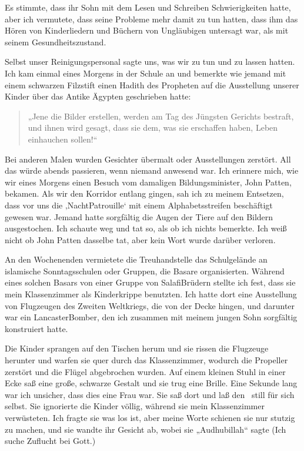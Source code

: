 \documentclass[12pt]{memoir}
\begin{document}
Es stimmte, dass ihr Sohn mit dem Lesen und Schreiben Schwierigkeiten hatte,
aber ich vermutete, dass seine Probleme mehr damit zu tun hatten,
dass ihm das Hören von Kinderliedern und Büchern von Ungläubigen untersagt war,
als mit seinem Gesundheitszustand.

Selbst unser Reinigungspersonal sagte uns, was wir zu tun und zu lassen hatten.
Ich kam einmal eines Morgens in der Schule an
und bemerkte wie jemand mit einem schwarzen Filzstift
einen Hadith des Propheten
auf die Ausstellung unserer Kinder über das Antike Ägypten geschrieben hatte:

\begin{quote}
„Jene die Bilder erstellen, werden am Tag des Jüngsten Gerichts bestraft,
und ihnen wird gesagt, dass sie dem, was sie erschaffen haben,
Leben einhauchen sollen!“
\end{quote}

Bei anderen Malen wurden Gesichter übermalt oder Ausstellungen zerstört.
All das würde abends passieren, wenn niemand anwesend war.
Ich erinnere mich, wie wir eines Morgens einen Besuch
vom damaligen Bildungsminister, John Patten, bekamen.
Als wir den Korridor entlang gingen, sah ich zu meinem Entsetzen,
dass vor uns die ‚Nacht\–Patrouille‘ mit einem Alphabetsstreifen
beschäftigt gewesen war.
Jemand hatte sorgfältig die Augen der Tiere auf den Bildern ausgestochen.
Ich schaute weg und tat so, als ob ich nichts bemerkte.
Ich weiß nicht ob John Patten dasselbe tat,
aber kein Wort wurde darüber verloren.


An den Wochenenden vermietete die Treuhandstelle das Schulgelände
an islamische Sonntagsschulen oder Gruppen, die Basare organisierten.
Während eines solchen Basars von einer Gruppe von Salafi\–Brüdern
stellte ich fest, dass sie mein Klassenzimmer als Kinderkrippe benutzten.
Ich hatte dort eine Ausstellung von Flugzeugen des Zweiten Weltkriegs,
die von der Decke hingen, und darunter war ein Lancaster\–Bomber,
den ich zusammen mit meinem jungen Sohn sorgfältig konstruiert hatte.

Die Kinder sprangen auf den Tischen herum
und sie rissen die Flugzeuge herunter
und warfen sie quer durch das Klassenzimmer,
wodurch die Propeller zerstört und die Flügel abgebrochen wurden.
Auf einem kleinen Stuhl in einer Ecke saß eine große, schwarze Gestalt
und sie trug eine Brille.
Eine Sekunde lang war ich unsicher, dass dies eine Frau war.
Sie saß dort und laß den \Quran\ still für sich selbst.
Sie ignorierte die Kinder völlig, während sie mein Klassenzimmer verwüsteten.
Ich fragte sie was los ist,
aber meine Worte schienen sie nur stutzig zu machen,
und sie wandte ihr Gesicht ab, wobei sie „Audhubillah“ sagte
(Ich suche Zuflucht bei Gott.)
\end{document}
